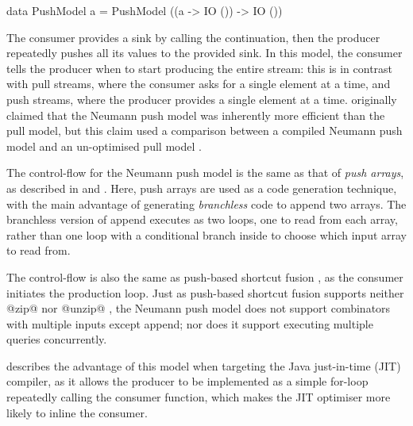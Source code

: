 \begin{haskell}
data PushModel a = PushModel ((a -> IO ()) -> IO ())
\end{haskell}

The consumer provides a sink by calling the continuation, then the producer repeatedly pushes all its values to the provided sink.
In this model, the consumer tells the producer when to start producing the entire stream: this is in contrast with pull streams, where the consumer asks for a single element at a time, and push streams, where the producer provides a single element at a time.
\citet{neumann2011efficiently} originally claimed that the Neumann push model was inherently more efficient than the pull model, but this claim used a comparison between a compiled Neumann push model and an un-optimised pull model \cite{shaikhha2018push}.

The control-flow for the Neumann push model is the same as that of \emph{push arrays}, as described in \citet{claessen2012expressive} and \citet{svensson2014defunctionalizing}.
Here, push arrays are used as a code generation technique, with the main advantage of generating \emph{branchless} code to append two arrays.
The branchless version of append executes as two loops, one to read from each array, rather than one loop with a conditional branch inside to choose which input array to read from.

The control-flow is also the same as push-based shortcut fusion \cite{gill1993short}, as the consumer initiates the production loop.
Just as push-based shortcut fusion supports neither @zip@ nor @unzip@ \cite{svenningsson2002shortcut}, the Neumann push model does not support combinators with multiple inputs except append; nor does it support executing multiple queries concurrently.

\citet{biboudis2017expressive} describes the advantage of this model when targeting the Java just-in-time (JIT) compiler, as it allows the producer to be implemented as a simple for-loop repeatedly calling the consumer function, which makes the JIT optimiser more likely to inline the consumer.




